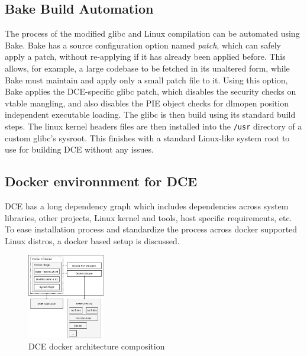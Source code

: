 \documentclass{sig-alternate}
\begin{document}
\subsection{Bake Build Automation}

The process of the modified glibc and Linux compilation can be automated using Bake.
Bake has a source configuration option named \textit{patch}, which can safely apply a patch, without re-applying if it has already been applied before.  
This allows, for example, a large codebase to be fetched in its unaltered form, while Bake must maintain and apply only a small patch file to it.
Using this option, Bake applies the DCE-specific glibc patch, which disables the security checks on vtable mangling, and also disables the 
PIE object checks for dlmopen position independent executable loading. The glibc is then build using its standard build steps. The linux kernel headers
files are then installed into the \texttt{/usr} directory of a custom glibc's sysroot. This finishes with a standard Linux-like system root to use for building 
DCE without any issues. 


\subsection{Docker environnment for DCE}
DCE has a long dependency graph which includes dependencies across 
system libraries, other projects, Linux kernel and tools, host specific requirements, etc. To ease installation process and standardize the process 
across docker supported Linux distros, a docker based setup is discussed.


\begin{figure}[!htb]
  \centering
    \includegraphics[width=0.30\textwidth]{figs/docker-architecture.jpg}

  \caption{DCE docker architecture composition}
  \label{fig:docker}
\end{figure}
\end{document}
